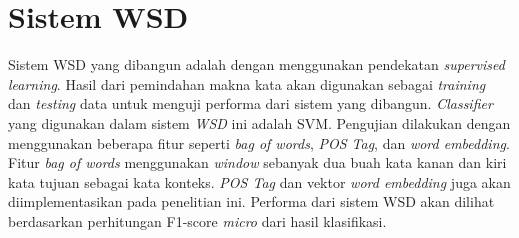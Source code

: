 \section{Sistem WSD} \label{sec:Sistem WSD}
Sistem WSD yang dibangun adalah dengan menggunakan pendekatan \textit{supervised learning}. Hasil dari pemindahan makna kata akan digunakan sebagai \textit{training} dan \textit{testing} data untuk menguji performa dari sistem yang dibangun. \textit{Classifier} yang digunakan dalam sistem \textit{WSD} ini adalah SVM. Pengujian dilakukan dengan menggunakan beberapa fitur seperti \textit{bag of words}, \textit{POS Tag}, dan \textit{word embedding}. Fitur \textit{bag of words} menggunakan \textit{window} sebanyak dua buah kata kanan dan kiri kata tujuan sebagai kata konteks. \textit{POS Tag} dan vektor \textit{word embedding} juga akan diimplementasikan pada penelitian ini. Performa dari sistem WSD akan dilihat berdasarkan perhitungan F1-score \textit{micro} dari hasil klasifikasi.
